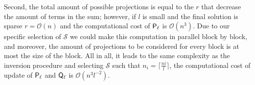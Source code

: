 {Second, the total amount of possible projections is equal to the $r$ that decrease the amount of terms in the sum; however, if $l$ is small and the final solution is sparse $r=\mathcal{O}(n)$ and the computational cost of ${\mathsf{P}}_\ell$ is $\mathcal{O}(n^3)$. Due to our specific selection of $\mathcal{S}$ we could make this computation in parallel block by block, and moreover, the amount of projections to be considered for every block is at most the size of the block. All in all, it leads to the same complexity as the inversion procedure and selecting $\mathcal{S}$ such that $n_i = \lceil
\frac{ni}{l}\rceil$, the computational cost of update of ${\mathsf{P}}_\ell$ and ${\mathsf{Q}}_\ell$ is $\mathcal{O}(n^3l^{-2})$.
}